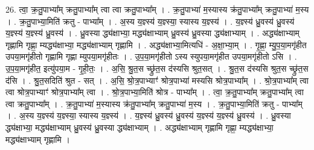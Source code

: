 \documentclass[17pt]{extarticle}
\begin{document}
26. त्वा॒ क्र॒तु॒पाभ्या᳚म् क्रतु॒पाभ्या᳚म् त्वा त्वा क्रतु॒पाभ्या᳚म् । . क्र॒तु॒पाभ्या॑ म॒स्यास्य क्र॑तु॒पाभ्या᳚म् क्रतु॒पाभ्या॑ म॒स्य । . क्र॒तु॒पाभ्या॒मिति॑ क्रतु - पाभ्या᳚म् । . अ॒स्य य॒ज्ञ्स्य॑ य॒ज्ञ्स्या॒ स्यास्य य॒ज्ञ्स्य॑ । . य॒ज्ञ्स्य॑ ध्रु॒वस्य॑ ध्रु॒वस्य॑ य॒ज्ञ्स्य॑ य॒ज्ञ्स्य॑ ध्रु॒वस्य॑ । . ध्रु॒वस्या द्ध्य॑क्षाभ्या॒ मद्ध्य॑क्षाभ्याम् ध्रु॒वस्य॑ ध्रु॒वस्या द्ध्य॑क्षाभ्याम् । . अद्ध्य॑क्षाभ्याम् गृह्णामि गृह्णा॒ म्यद्ध्य॑क्षाभ्या॒ मद्ध्य॑क्षाभ्याम् गृह्णामि । . अद्ध्य॑क्षाभ्या॒मित्यधि॑ - अ॒क्षा॒भ्या॒म् । . गृ॒ह्णा॒ म्यु॒प॒या॒मगृ॑हीत उपया॒मगृ॑हीतो गृह्णामि गृह्णा म्युपया॒मगृ॑हीतः । . उ॒प॒या॒मगृ॑हीतो ऽस्य स्युपया॒मगृ॑हीत उपया॒मगृ॑हीतो ऽसि । . उ॒प॒या॒मगृ॑हीत॒ इत्यु॑पया॒म - गृ॒ही॒तः॒ । . अ॒सि॒ श्रु॒त॒स च्छ्रु॑त॒स द॑स्यसि श्रुत॒सत् । . श्रु॒त॒स द॑स्यसि श्रुत॒स च्छ्रु॑त॒स द॑सि । . श्रु॒त॒सदिति॑ श्रुत - सत् । . अ॒सि॒ श्रो॒त्र॒पाभ्याꣳ॑ श्रोत्र॒पाभ्या॑ मस्यसि श्रोत्र॒पाभ्या᳚म् । . श्रो॒त्र॒पाभ्या᳚म् त्वा त्वा श्रोत्र॒पाभ्याꣳ॑ श्रोत्र॒पाभ्या᳚म् त्वा । . श्रो॒त्र॒पाभ्या॒मिति॑ श्रोत्र - पाभ्या᳚म् । . त्वा॒ क्र॒तु॒पाभ्या᳚म् क्रतु॒पाभ्या᳚म् त्वा त्वा क्रतु॒पाभ्या᳚म् । . क्र॒तु॒पाभ्या॑ म॒स्यास्य क्र॑तु॒पाभ्या᳚म् क्रतु॒पाभ्या॑ म॒स्य । . क्र॒तु॒पाभ्या॒मिति॑ क्रतु - पाभ्या᳚म् । . अ॒स्य य॒ज्ञ्स्य॑ य॒ज्ञ्स्या॒ स्यास्य य॒ज्ञ्स्य॑ । . य॒ज्ञ्स्य॑ ध्रु॒वस्य॑ ध्रु॒वस्य॑ य॒ज्ञ्स्य॑ य॒ज्ञ्स्य॑ ध्रु॒वस्य॑ । . ध्रु॒वस्या द्ध्य॑क्षाभ्या॒ मद्ध्य॑क्षाभ्याम् ध्रु॒वस्य॑ ध्रु॒वस्या द्ध्य॑क्षाभ्याम् । . अद्ध्य॑क्षाभ्याम् गृह्णामि गृह्णा॒ म्यद्ध्य॑क्षाभ्या॒ मद्ध्य॑क्षाभ्याम् गृह्णामि । \newline
\end{document}
